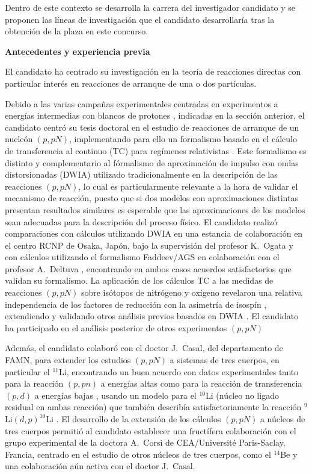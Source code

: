 \documentclass[a4paper,12pt,twoside]{article}
\begin{document}
Dentro de este contexto se desarrolla la carrera del investigador candidato y se proponen las líneas de investigación que el candidato desarrollaría tras la obtención de la plaza en este concurso.

\textbf{Antecedentes y experiencia previa}

El candidato ha centrado su investigación en la teoría de reacciones directas con particular interés en reacciones de arranque de una o dos partículas.

Debido a las varias campañas experimentales centradas en experimentos a energías intermedias con blancos de protones \cite{r3b07,Wak18}, indicadas en la sección anterior, el candidato centró su tesis doctoral en el estudio de reacciones de arranque de un nucleón $(p,pN)$, implementando para ello un formalismo basado en el cálculo de transferencia al continuo (TC) para regímenes relativistas \cite{Mor15}. Este formalismo es distinto y complementario al fórmalismo de aproximación de impulso con ondas distorsionadas (DWIA) \cite{Jac66} utilizado tradicionalmente en la descripción de las reacciones $(p,pN)$, lo cual es particularmente relevante a la hora de validar el mecanismo de reacción, puesto que si dos modelos con aproximaciones distintas presentan resultados similares es esperable que las aproximaciones de los modelos sean adecuadas para la descripción del proceso físico. El candidato realizó comparaciones con cálculos utilizando DWIA en una estancia de colaboración en el centro RCNP de Osaka, Japón, bajo la supervisión del profesor K.~Ogata \cite{benchmarkdwia} y con cálculos utilizando el formalismo Faddeev/AGS \cite{Fad60, Alt67} en colaboración con el profesor A.~Deltuva \cite{benchmarkfaddeev}, encontrando en ambos casos acuerdos satisfactorios que validan su formalismo. La aplicación de los cálculos TC a las medidas de reacciones $(p,pN)$ sobre isótopos de nitrógeno y oxígeno revelaron una relativa independencia de los factores de reducción con la asimetría de isospín \cite{ppn}, extendiendo y validando otros análisis previos basados en DWIA \cite{Ata18}. El candidato ha participado en el análisis posterior de otros experimentos $(p,pN)$ \cite{thomas,49cl,49ar}

Además, el candidato colaboró con el doctor J.~Casal, del departamento de FAMN, para extender los estudios $(p,pN)$ a sistemas de tres cuerpos, en particular el $^{11}$Li, encontrando un buen acuerdo con datos experimentales tanto para la reacción $(p,pn)$ a energías altas \cite{11lippn} como para la reacción de transferencia $(p,d)$ a energías bajas \cite{11lipd}, usando un modelo para el $^{10}$Li (núcleo no ligado residual en ambas reacción) que también describía satisfactoriamente la reacción $^9$Li$(d,p)^{10}$Li \cite{9lidp}. El desarrollo de la extensión de los cálculos $(p,pN)$ a núcleos de tres cuerpos permitió al candidato establecer una fructífera colaboración con el grupo experimental de la doctora A.~Corsi de CEA/Université Paris-Saclay, Francia, centrado en el estudio de otros núcleos de tres cuerpos, como el $^{14}$Be \cite{14be,openingangle} y una colaboración aún activa con el doctor J.~Casal.
\end{document}
